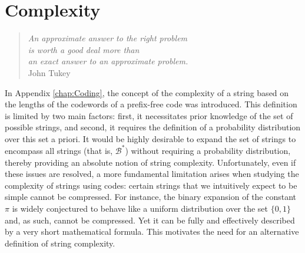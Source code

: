 %
%




\chapter{Complexity}
\label{chap:Algorithmic_Information}

\begin{quote}
\begin{flushright}
\emph{An approximate answer to the right problem  \\
is worth a good deal more than \\
an exact answer to an approximate problem. \\}
John Tukey
\end{flushright}
\end{quote}
\bigskip

In Appendix \ref{chap:Coding}, the concept of the complexity of a string based on the lengths of the codewords of a prefix-free code was introduced. This definition is limited by two main factors: first, it necessitates prior knowledge of the set of possible strings, and second, it requires the definition of a probability distribution over this set a priori. It would be highly desirable to expand the set of strings to encompass all strings (that is, $\mathcal{B}^\ast$) without requiring a probability distribution, thereby providing an absolute notion of string complexity. Unfortunately, even if these issues are resolved, a more fundamental limitation arises when studying the complexity of strings using codes: certain strings that we intuitively expect to be simple cannot be compressed. For instance, the binary expansion of the constant $\pi$ is widely conjectured to behave like a uniform distribution over the set $\{0, 1\}$ and, as such, cannot be compressed. Yet it can be fully and effectively described by a very short mathematical formula. This motivates the need for an alternative definition of string complexity.

